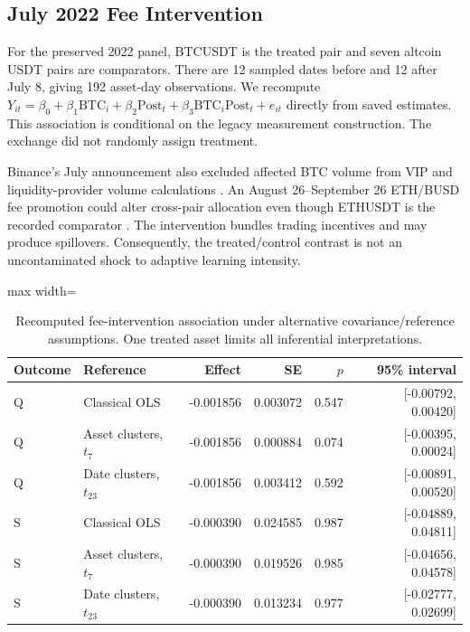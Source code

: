 \documentclass[12pt]{article}
\theoremstyle{definition}
\theoremstyle{remark}
\begin{document}
\subsection{July 2022 Fee Intervention}
For the preserved 2022 panel, BTCUSDT is the treated pair and seven altcoin USDT pairs are comparators. There are 12 sampled dates before and 12 after July 8, giving 192 asset-day observations. We recompute $Y_{it}=\beta_0+\beta_1\mathrm{BTC}_i+\beta_2\mathrm{Post}_t+\beta_3\mathrm{BTC}_i\mathrm{Post}_t+e_{it}$ directly from saved estimates. This association is conditional on the legacy measurement construction. The exchange did not randomly assign treatment.

Binance's July announcement also excluded affected BTC volume from VIP and liquidity-provider volume calculations \citep{binance2022volume}. An August 26--September 26 ETH/BUSD fee promotion could alter cross-pair allocation even though ETHUSDT is the recorded comparator \citep{binance2022eth}. The intervention bundles trading incentives and may produce spillovers. Consequently, the treated/control contrast is not an uncontaminated shock to adaptive learning intensity.

\begin{table}[htbp]
\centering\small
\caption{Recomputed fee-intervention association under alternative covariance/reference assumptions. One treated asset limits all inferential interpretations.}
\label{tab:fee_revised}
\begin{adjustbox}{max width=\textwidth}
\begin{tabular}{llrrrr}\toprule
Outcome & Reference & Effect & SE & $p$ & 95\% interval \\\midrule
Q & Classical OLS & -0.001856 & 0.003072 & 0.547 & [-0.00792, 0.00420] \\
Q & Asset clusters, $t_7$ & -0.001856 & 0.000884 & 0.074 & [-0.00395, 0.00024] \\
Q & Date clusters, $t_{23}$ & -0.001856 & 0.003412 & 0.592 & [-0.00891, 0.00520] \\
S & Classical OLS & -0.000390 & 0.024585 & 0.987 & [-0.04889, 0.04811] \\
S & Asset clusters, $t_7$ & -0.000390 & 0.019526 & 0.985 & [-0.04656, 0.04578] \\
S & Date clusters, $t_{23}$ & -0.000390 & 0.013234 & 0.977 & [-0.02777, 0.02699] \\
\bottomrule\end{tabular}
\end{adjustbox}
\end{table}
\end{document}
